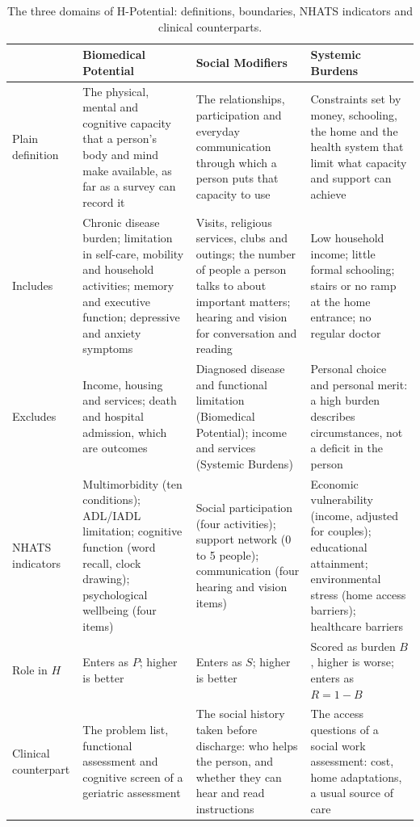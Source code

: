 \begin{table}[htbp]
\centering
\caption{The three domains of H-Potential: definitions, boundaries, NHATS indicators and clinical counterparts.}
\label{tab:lit-domains}
\footnotesize
\renewcommand{\arraystretch}{1.2}
\begin{tabular}{>{\raggedright\arraybackslash}p{2.2cm} >{\raggedright\arraybackslash}p{3.85cm} >{\raggedright\arraybackslash}p{3.85cm} >{\raggedright\arraybackslash}p{3.85cm}}
\toprule
 & \textbf{Biomedical Potential} & \textbf{Social Modifiers} & \textbf{Systemic Burdens} \\
\midrule
Plain definition & The physical, mental and cognitive capacity that a person's body and mind make available, as far as a survey can record it & The relationships, participation and everyday communication through which a person puts that capacity to use & Constraints set by money, schooling, the home and the health system that limit what capacity and support can achieve \\
\addlinespace
Includes & Chronic disease burden; limitation in self-care, mobility and household activities; memory and executive function; depressive and anxiety symptoms & Visits, religious services, clubs and outings; the number of people a person talks to about important matters; hearing and vision for conversation and reading & Low household income; little formal schooling; stairs or no ramp at the home entrance; no regular doctor \\
\addlinespace
Excludes & Income, housing and services; death and hospital admission, which are outcomes & Diagnosed disease and functional limitation (Biomedical Potential); income and services (Systemic Burdens) & Personal choice and personal merit: a high burden describes circumstances, not a deficit in the person \\
\addlinespace
NHATS indicators & Multimorbidity (ten conditions); ADL/IADL limitation; cognitive function (word recall, clock drawing); psychological wellbeing (four items) & Social participation (four activities); support network (0 to 5 people); communication (four hearing and vision items) & Economic vulnerability (income, adjusted for couples); educational attainment; environmental stress (home access barriers); healthcare barriers \\
\addlinespace
Role in $H$ & Enters as $P$; higher is better & Enters as $S$; higher is better & Scored as burden $B$, higher is worse; enters as $R=1-B$ \\
\addlinespace
Clinical counterpart & The problem list, functional assessment and cognitive screen of a geriatric assessment & The social history taken before discharge: who helps the person, and whether they can hear and read instructions & The access questions of a social work assessment: cost, home adaptations, a usual source of care \\
\bottomrule
\end{tabular}
\end{table}


